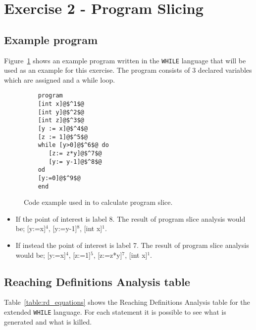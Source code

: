 \section{Exercise 2 - Program Slicing}

\subsection{Example program}
Figure~\ref{fig:codeexample} shows an example program written in the \texttt{WHILE} language that will be used as an example for this exercise. The program consists of 3 declared variables which are assigned and a while loop.
\begin{figure}
	\begin{lstlisting}
	program
	[int x]@$^1$@
	[int y]@$^2$@
	[int z]@$^3$@
	[y := x]@$^4$@
	[z := 1]@$^5$@
	while [y>0]@$^6$@ do
	   [z:= z*y]@$^7$@
	   [y:= y-1]@$^8$@
	od
	[y:=0]@$^9$@
	end
	\end{lstlisting}
	\label{fig:codeexample}
	\caption{Code example used in to calculate program slice.}
\end{figure}

\begin{itemize}
	\item If the point of interest is label 8. The result of program slice analysis would be; [y:=x]$^4$, [y:=y-1]$^8$, [int x]$^1$.
	\item If instead the point of interest is label 7.  The result of program slice analysis would be; [y:=x]$^4$, [z:=1]$^5$, [z:=z*y]$^7$, [int x]$^1$.
\end{itemize}

\subsection{Reaching Definitions Analysis table}
Table~\ref{table:rd_equations} shows the Reaching Definitions Analysis table for the extended \texttt{WHILE} language. For each statement it is possible to see what is generated and what is killed.

